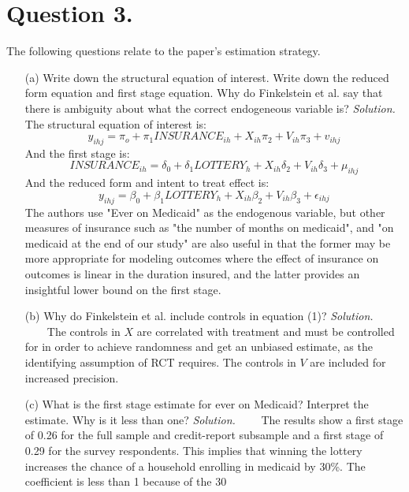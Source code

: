 \documentclass[
]{article}
\begin{document}
\hypertarget{question-3.}{%
\section{Question 3.}\label{question-3.}}

The following questions relate to the paper's estimation strategy.

\begin{enumerate}

\item[(a)] Write down the structural equation of interest. Write down the reduced form equation and first stage equation. Why do Finkelstein et al. say that there is ambiguity about what the correct endogeneous variable is?
\newline
\newline
\textit{Solution.}\newline
The structural equation of interest is:
\[y_{ihj} = \pi_o + \pi_1 INSURANCE_{ih} + X_{ih} \pi_2 + V_{ih}\pi_3 +v_{ihj}\]
And the first stage is: 
\[INSURANCE_{ih} = \delta_0 + \delta_1 LOTTERY_{h} + X_{ih} \delta_2 + V_{ih}\delta_3 +\mu_{ihj}\]
And the reduced form and intent to treat effect is:
\[y_{ihj} = \beta_0 + \beta_1 LOTTERY_h + X_{ih} \beta_2 + V_{ih}\beta_3 +\epsilon_{ihj}\]
The authors use "Ever on Medicaid" as the endogenous variable, but other measures of insurance such as "the number of months on medicaid", and "on medicaid at the end of our study" are also useful in that the former may be more appropriate for modeling outcomes where the effect of insurance on outcomes is linear in the duration insured, and the latter provides an insightful lower bound on the first stage.



\item[(b)] Why do Finkelstein et al. include controls in equation (1)?
\newline
\newline
\textit{Solution.}\newline
    The controls in $X$ are correlated with treatment and must be controlled for in order to achieve randomness and get an unbiased estimate, as the identifying assumption of RCT requires. The controls in $V$ are included for increased precision. 

\item[(c)]What is the first stage estimate for ever on Medicaid? Interpret the estimate. Why is it less than one?
\newline
\newline
\textit{Solution.}\newline
    The results show a first stage of 0.26 for the full sample and credit-report subsample and a first stage of 0.29 for the survey respondents. This implies that winning the lottery increases the chance of a household enrolling in medicaid by 30\%. The coefficient is less than 1 because of the 30%


\end{enumerate}
\end{document}
